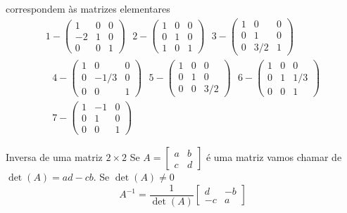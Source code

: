 \documentclass{beamer}
\begin{document}
\begin{frame}{correspondem às matrizes elementares}
  \begin{gather*}
1-  \begin{pmatrix}
    1 & 0 & 0 \\ 
    -2 & 1 & 0 \\
    0 & 0 & 1
  \end{pmatrix}\text{ }2- \begin{pmatrix}
    1 & 0 & 0 \\ 
    0 & 1 & 0 \\
    1 & 0 & 1
  \end{pmatrix}\text{ }3- \begin{pmatrix}
    1 & 0 & 0 \\ 
    0 & 1 & 0 \\
    0 & 3/2 & 1
  \end{pmatrix} \\
  \text{ }4- \begin{pmatrix}
    1 & 0 & 0 \\ 
    0 & -1/3 & 0 \\
    0 & 0 & 1
  \end{pmatrix}\text{ }5- \begin{pmatrix}
    1 & 0 & 0 \\ 
    0 & 1 & 0 \\
    0 & 0 & 3/2
  \end{pmatrix}\text{ }6- \begin{pmatrix}
    1 & 0 & 0 \\ 
    0 & 1 & 1/3 \\
    0 & 0 & 1
  \end{pmatrix} \\
  \text{ }7- \begin{pmatrix}
    1 & -1 & 0 \\ 
    0 & 1 & 0 \\
    0 & 0 & 1
  \end{pmatrix}
  \end{gather*}
\end{frame}





\begin{frame}{Inversa de uma matriz $2\times 2$}
  Se $A=\begin{bmatrix}
    a & b \\ c & d
  \end{bmatrix}$ é uma matriz vamos chamar de 
  $\det(A) = ad -cb$. Se $\det(A)\neq 0$ 
  $$ A^{-1}=\frac{1}{\det(A)} \begin{bmatrix}
    d & -b \\
    -c & a
  \end{bmatrix}$$
\end{frame}
\end{document}
